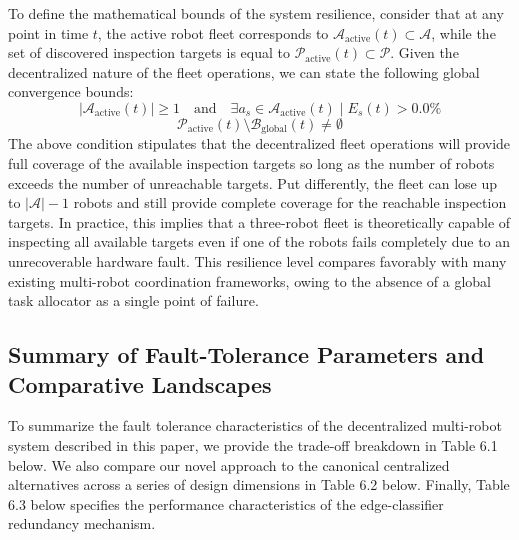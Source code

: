 To define the mathematical bounds of the system resilience, consider that at any point in time $t$, the active robot fleet corresponds to $\mathcal{A}_{\text{active}}(t) \subset \mathcal{A}$, while the set of discovered inspection targets is equal to $\mathcal{P}_{\text{active}}(t) \subset \mathcal{P}$. Given the decentralized nature of the fleet operations, we can state the following global convergence bounds:
\begin{equation} \lvert\mathcal{A}_{\text{active}}(t)\rvert \ge 1 \quad \text{and} \quad \exists a_s \in \mathcal{A}_{\text{active}}(t) \mid E_s(t) > 0.0\% \label{eq:fleet_survival_boundary} \end{equation}
\begin{equation} \mathcal{P}_{\text{active}}(t) \setminus \mathcal{B}_{\text{global}}(t) \neq \emptyset \label{eq:target_reachability_boundary} \end{equation}
The above condition stipulates that the decentralized fleet operations will provide full coverage of the available inspection targets so long as the number of robots exceeds the number of unreachable targets. Put differently, the fleet can lose up to $\lvert\mathcal{A}\rvert - 1$ robots and still provide complete coverage for the reachable inspection targets. In practice, this implies that a three-robot fleet is theoretically capable of inspecting all available targets even if one of the robots fails completely due to an unrecoverable hardware fault. This resilience level compares favorably with many existing multi-robot coordination frameworks, owing to the absence of a global task allocator as a single point of failure.

\subsection{Summary of Fault-Tolerance Parameters and Comparative Landscapes}

To summarize the fault tolerance characteristics of the decentralized multi-robot system described in this paper, we provide the trade-off breakdown in Table 6.1 below. We also compare our novel approach to the canonical centralized alternatives across a series of design dimensions in Table 6.2 below. Finally, Table 6.3 below specifies the performance characteristics of the edge-classifier redundancy mechanism.

